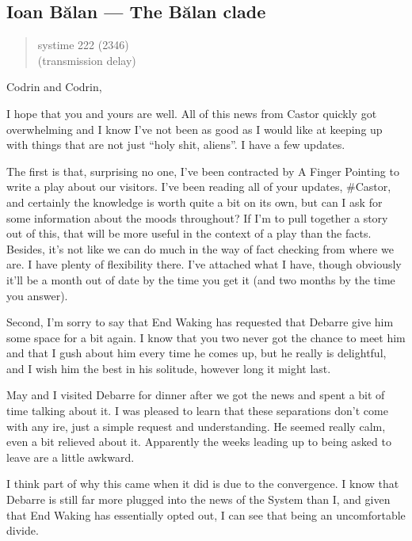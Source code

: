\hypertarget{ioan-bux103lan-the-bux103lan-clade}{%
\subsection{Ioan Bălan — The Bălan clade}\label{ioan-bux103lan-the-bux103lan-clade}}

\begin{quote}
systime 222 (2346)\\
(transmission delay)
\end{quote}

Codrin and Codrin,

I hope that you and yours are well. All of this news from Castor quickly got overwhelming and I know I've not been as good as I would like at keeping up with things that are not just ``holy shit, aliens''. I have a few updates.

The first is that, surprising no one, I've been contracted by A Finger Pointing to write a play about our visitors. I've been reading all of your updates, \#Castor, and certainly the knowledge is worth quite a bit on its own, but can I ask for some information about the moods throughout? If I'm to pull together a story out of this, that will be more useful in the context of a play than the facts. Besides, it's not like we can do much in the way of fact checking from where we are. I have plenty of flexibility there. I've attached what I have, though obviously it'll be a month out of date by the time you get it (and two months by the time you answer).

Second, I'm sorry to say that End Waking has requested that Debarre give him some space for a bit again. I know that you two never got the chance to meet him and that I gush about him every time he comes up, but he really is delightful, and I wish him the best in his solitude, however long it might last.

May and I visited Debarre for dinner after we got the news and spent a bit of time talking about it. I was pleased to learn that these separations don't come with any ire, just a simple request and understanding. He seemed really calm, even a bit relieved about it. Apparently the weeks leading up to being asked to leave are a little awkward.

I think part of why this came when it did is due to the convergence. I know that Debarre is still far more plugged into the news of the System than I, and given that End Waking has essentially opted out, I can see that being an uncomfortable divide.

